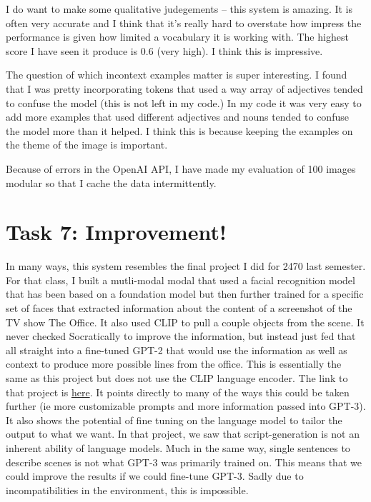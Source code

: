 \documentclass{article}
\begin{document}
I do want to make some qualitative judegements -- this system is amazing. It is often very accurate and I think that it's really hard to overstate how impress the performance is given how limited a vocabulary it is working with. The highest score I have seen it produce is 0.6 (very high). I think this is impressive. 

The question of which incontext examples matter is super interesting. I found that I was pretty incorporating tokens that used a way array of adjectives tended to confuse the model (this is not left in my code.) In my code it was very easy to add more examples that used different adjectives and nouns tended to confuse the model more than it helped. I think this is because keeping the examples on the theme of the image is important.

Because of errors in the OpenAI API, I have made my evaluation of 100 images modular so that I cache the data intermittently. 

\section*{Task 7: Improvement!} In many ways, this system resembles the final project I did for 2470 last semester. For that class, I built a mutli-modal modal that used a facial recognition model that has been based on a foundation model but then further trained for a specific set of faces that extracted information about the content of a screenshot of the TV show The Office. It also used CLIP to pull a couple objects from the scene. It never checked Socratically to improve the information, but instead just fed that all straight into a fine-tuned GPT-2 that would use the information as well as context to produce more possible lines from the office. This is essentially the same as this project but does not use the CLIP language encoder. The link to that project is \href{https://github.com/usernamenoahfoster/Regional_Programmer}{here}. It points directly to many of the ways this could be taken further (ie more customizable prompts and more information passed into GPT-3). It also shows the potential of fine tuning on the language model to tailor the output to what we want. In that project, we saw that script-generation is not an inherent ability of language models. Much in the same way, single sentences to describe scenes is not what GPT-3 was primarily trained on. This means that we could improve the results if we could fine-tune GPT-3. Sadly due to incompatibilities in the environment, this is impossible. 
\end{document}
